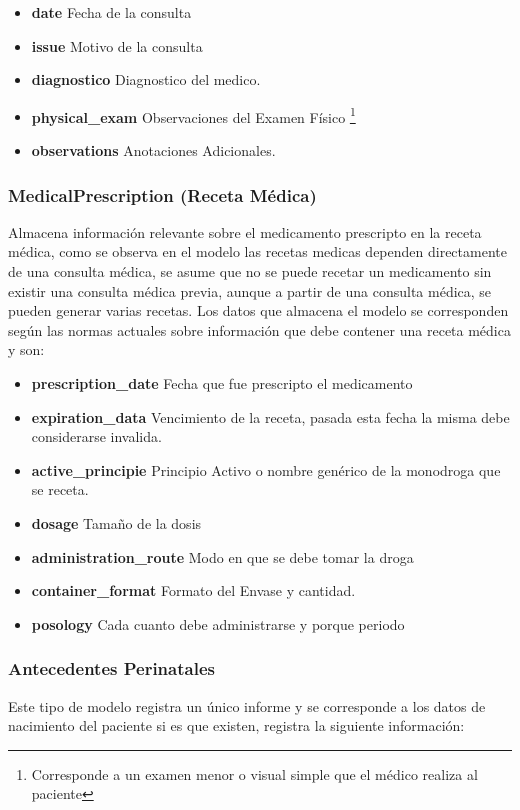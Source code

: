 \begin{itemize}
    \item \textbf{date} Fecha de la consulta
    \item \textbf{issue} Motivo de la consulta
    \item \textbf{diagnostico} Diagnostico del medico.
    \item \textbf{physical\_exam} Observaciones del Examen Físico \footnote{Corresponde a un examen menor o visual simple que el médico realiza al paciente}
    \item \textbf{observations} Anotaciones Adicionales. 
\end{itemize}

\subsubsection{MedicalPrescription (Receta Médica)}

Almacena información relevante sobre el medicamento prescripto en la receta médica, como se observa en el modelo las recetas medicas dependen directamente de una consulta médica, se asume que no se puede recetar un medicamento sin existir una consulta médica previa, aunque a partir de una consulta médica, se pueden generar varias recetas. Los datos que almacena el modelo se corresponden según las normas actuales sobre información que debe contener una receta médica y son:

\begin{itemize}
    \item \textbf{prescription\_date} Fecha que fue prescripto el medicamento
    \item \textbf{expiration\_data} Vencimiento de la receta, pasada esta fecha la  misma debe considerarse invalida.
    \item \textbf{active\_principie} Principio Activo o nombre genérico de la monodroga que se receta.
    \item \textbf{dosage} Tamaño de la dosis
    \item \textbf{administration\_route} Modo en que se debe tomar la droga
    \item \textbf{container\_format} Formato del Envase y cantidad.
    \item \textbf{posology} Cada cuanto debe administrarse y porque periodo
\end{itemize}

\subsubsection{Antecedentes Perinatales}
Este tipo de modelo registra un único informe y se corresponde a los datos de nacimiento del paciente si es que existen, registra la siguiente información:

